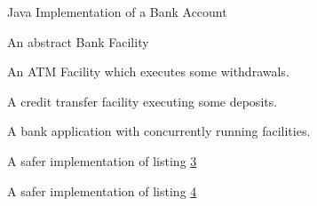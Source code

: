 \documentclass[10pt,a4paper]{article}
\begin{document}
\begin{figure}
\caption{Java Implementation of a Bank Account}
\begin{center}

\label{jaccount}
\end{center}
\end{figure}

\begin{figure}
\caption{An abstract Bank Facility}
\begin{center}

\label{jfacility}
\end{center}
\end{figure}

\begin{figure}
\caption{An ATM Facility which executes some withdrawals.}
\begin{center}

\label{jatm}
\end{center}
\end{figure}

\begin{figure}
\caption{A credit transfer facility executing some deposits.}
\begin{center}

\label{jcredit}
\end{center}
\end{figure}

\begin{figure}
\caption{A bank application with concurrently running facilities.}
\begin{center}

\label{jbankapp}
\end{center}
\end{figure}

\begin{figure}
\caption{A safer implementation of listing \ref{jatm}}
\begin{center}

\label{jatm-synch}
\end{center}
\end{figure}

\begin{figure}
\caption{A safer implementation of listing \ref{jcredit}}
\begin{center}

\label{jcredit-synch}
\end{center}
\end{figure}
\end{document}
